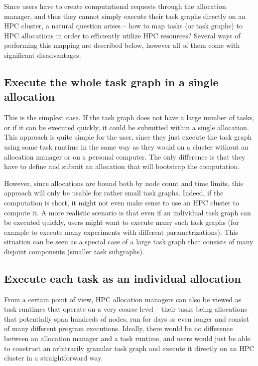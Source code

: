 Since users have to create computational requests through the allocation manager, and thus they
cannot simply execute their task graphs directly on an HPC cluster, a natural question arises --
how to map tasks (or task graphs) to HPC allocations in order to efficiently utilize HPC resources?
Several ways of performing this mapping are described below, however all of them come with
significant disadvantages.

\subsection*{Execute the whole task graph in a single allocation} This is the simplest case. If the
task graph does not have a large number of tasks, or if it can be executed quickly, it could be
submitted within a single allocation. This approach is quite simple for the user, since they just
execute the task graph using some task runtime in the same way as they would on a cluster without
an allocation manager or on a personal computer. The only difference is that they have to define
and submit an allocation that will bootstrap the computation.

However, since allocations are bound both by node count and time limits, this approach will only be
usable for rather small task graphs. Indeed, if the computation is short, it might not even make
sense to use an HPC cluster to compute it. A more realistic scenario is that even if an individual
task graph can be executed quickly, users might want to execute many such task graphs (for example
to execute many experiments with different parametrizations). This situation can be seen as a
special case of a large task graph that consists of many disjoint components (smaller task
subgraphs).

\subsection*{Execute each task as an individual allocation} From a certain point of view, HPC
allocation managers can also be viewed as task runtimes that operate on a very coarse level --
their tasks being allocations that potentially span hundreds of nodes, run for days or even longer
and consist of many different program executions. Ideally, there would be no difference between an
allocation manager and a task runtime, and users would just be able to construct an arbitrarily
granular task graph and execute it directly on an HPC cluster in a straightforward way.

